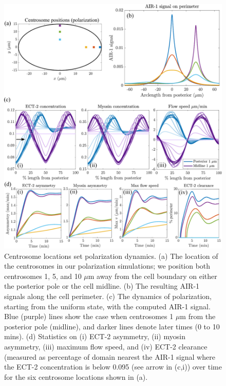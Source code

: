\documentclass[11pt]{article}
\begin{document}
\begin{figure}
\centering
\includegraphics[width=\textwidth]{Glotzer/Fig5/Fig5-crop.pdf}
\caption{\label{fig:PolLoc}Centrosome locations set polarization dynamics. (a) The location of the centrosomes in our polarization simulations; we position both centrosomes 1, 5, and 10 $\mu$m away from the cell boundary on either the posterior pole or the cell midline. (b) The resulting AIR-1 signals along the cell perimeter. (c) The dynamics of polarization, starting from the uniform state, with the computed AIR-1 signal. Blue (purple) lines show the case when centrosomes 1 $\mu$m from the posterior pole (midline), and darker lines denote later times (0 to 10 mins). (d) Statistics on (i) ECT-2 asymmetry, (ii) myosin asymmetry, (iii) maximum flow speed, and (iv) ECT-2 clearance (measured as percentage of domain nearest the AIR-1 signal where the ECT-2 concentration is below 0.095 (see arrow in (c,i)) over time for the six centrosome locations shown in (a).}
\end{figure}
\end{document}
